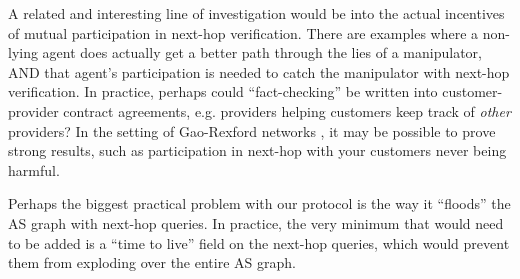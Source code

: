 \documentclass[10pt]{article}
\begin{document}
  A related and interesting line of investigation would be into the
  actual incentives of mutual participation in next-hop verification.
  There are examples where a non-lying agent does actually get a better path
  through the lies of a manipulator, AND that agent's participation is needed to
  catch the manipulator with next-hop verification.
  In practice, perhaps could ``fact-checking'' be written into
  customer-provider contract agreements,
  e.g. providers helping customers keep track of \emph{other} providers?
  In the setting of Gao-Rexford networks \cite{GaoRexford}, it may be possible
  to prove strong results, such as participation in next-hop with your customers
  never being harmful.



  Perhaps the biggest practical problem with our protocol
  is the way it ``floods'' the AS graph with next-hop queries.
  In practice, the very minimum that would need to be added is a
  ``time to live'' field on the next-hop queries,
  which would prevent them from exploding over the entire AS graph.
\end{document}
